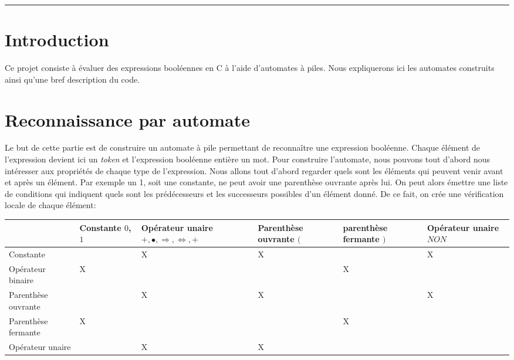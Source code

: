 \documentclass{Support}
\begin{document}
\renewcommand{\myTitle}{Théorie des langages- IN406}
\renewcommand{\MyAuthor}{Evaluation d'expressions booléennes}
\renewcommand{\MyDepartment}{Zeyneb Bouabdallaoui, Nicolas Fond}
\renewcommand{\ID}{21904931 / 21908626}
\maketitle

\vspace{-1.9em}\noindent\rule{\textwidth}{1pt}
\onehalfspacing

\section*{Introduction}
Ce projet consiste à évaluer des expressions booléennes en C à l'aide d'automates à piles. Nous expliquerons ici les automates construits ainsi qu'une bref description du code.

\section{Reconnaissance par automate}
Le but de cette partie est de construire un automate à pile permettant de reconnaître une expression booléenne. Chaque élément de l'expression devient ici un \textit{token} et l'expression booléenne entière un mot. Pour construire l'automate, nous pouvons tout d'abord nous intéresser aux propriétés de chaque type de l'expression. Nous allons tout d'abord regarder quels sont les éléments qui peuvent venir avant et après un élément. Par exemple un 1, soit une constante, ne peut avoir une parenthèse ouvrante après lui. On peut alors émettre une liste de conditions qui indiquent quels sont les prédécesseurs et les successeurs possibles d'un élément donné. De ce fait, on crée une vérification locale de chaque élément:

\vspace{0,4cm}
\hspace*{-1.9cm}
\begin{tabular}{|m{}||m{2cm}|m{3cm}|m{}|m{}|m{2cm}|} 
    \hline
      & Constante $0$, $1$  & Opérateur unaire $+, \bullet , \Rightarrow , \iff, +$ & Parenthèse ouvrante $($ & parenthèse fermante $)$  & Opérateur unaire $NON$ \\
    \hline
     Constante           &   &  X  &  X  &    & X \\
    \hline
     Opérateur binaire   & X &     &     &  X &  \\
    \hline
     Parenthèse ouvrante &   & X   & X   &    & X  \\
    \hline
     Parenthèse fermante & X &     &     & X  &  \\
    \hline
     Opérateur unaire    &   & X   & X   &    &  \\
    \hline
\end{tabular}
\end{document}
